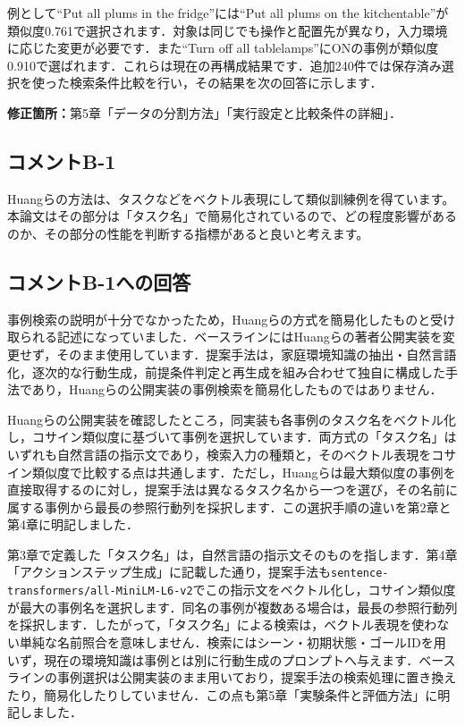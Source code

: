 \documentclass{jsarticle}
\begin{document}
例として``Put all plums in the fridge''には``Put all plums on the kitchentable''が類似度0.761で選択されます．対象は同じでも操作と配置先が異なり，入力環境に応じた変更が必要です．また``Turn off all tablelamps''にONの事例が類似度0.910で選ばれます．これらは現在の再構成結果です．追加240件では保存済み選択を使った検索条件比較を行い，その結果を次の回答に示します．

\noindent\textbf{修正箇所：}第5章「データの分割方法」「実行設定と比較条件の詳細」．


\subsection*{コメントB-1}
\begin{screen}
Huangらの方法は、タスクなどをベクトル表現にして類似訓練例を得ています。本論文はその部分は「タスク名」で簡易化されているので、どの程度影響があるのか、その部分の性能を判断する指標があると良いと考えます。
\end{screen}
\subsection*{コメントB-1への回答}
事例検索の説明が十分でなかったため，Huangらの方式を簡易化したものと受け取られる記述になっていました．ベースラインにはHuangらの著者公開実装を変更せず，そのまま使用しています．提案手法は，家庭環境知識の抽出・自然言語化，逐次的な行動生成，前提条件判定と再生成を組み合わせて独自に構成した手法であり，Huangらの公開実装の事例検索を簡易化したものではありません．

Huangらの公開実装を確認したところ，同実装も各事例のタスク名をベクトル化し，コサイン類似度に基づいて事例を選択しています．両方式の「タスク名」はいずれも自然言語の指示文であり，検索入力の種類と，そのベクトル表現をコサイン類似度で比較する点は共通します．ただし，Huangらは最大類似度の事例を直接取得するのに対し，提案手法は異なるタスク名から一つを選び，その名前に属する事例から最長の参照行動列を採択します．この選択手順の違いを第2章と第4章に明記しました．

第3章で定義した「タスク名」は，自然言語の指示文そのものを指します．第4章「アクションステップ生成」に記載した通り，提案手法も\texttt{sentence-transformers/all-MiniLM-L6-v2}でこの指示文をベクトル化し，コサイン類似度が最大の事例名を選択します．同名の事例が複数ある場合は，最長の参照行動列を採択します．したがって，「タスク名」による検索は，ベクトル表現を使わない単純な名前照合を意味しません．検索にはシーン・初期状態・ゴールIDを用いず，現在の環境知識は事例とは別に行動生成のプロンプトへ与えます．ベースラインの事例選択は公開実装のまま用いており，提案手法の検索処理に置き換えたり，簡易化したりしていません．この点も第5章「実験条件と評価方法」に明記しました．
\end{document}
